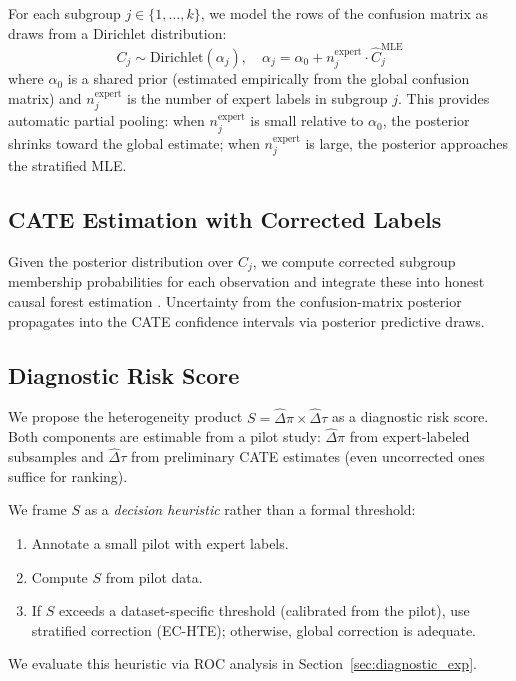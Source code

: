 \documentclass[11pt,a4paper]{article}
\begin{document}
For each subgroup $j \in \{1, \ldots, k\}$, we model the rows of the confusion matrix as draws from a Dirichlet distribution:
\begin{equation}
C_j \sim \text{Dirichlet}(\alpha_j), \quad \alpha_j = \alpha_0 + n_j^{\text{expert}} \cdot \hat{C}_j^{\text{MLE}}
\end{equation}
where $\alpha_0$ is a shared prior (estimated empirically from the global confusion matrix) and $n_j^{\text{expert}}$ is the number of expert labels in subgroup $j$.
This provides automatic partial pooling: when $n_j^{\text{expert}}$ is small relative to $\alpha_0$, the posterior shrinks toward the global estimate; when $n_j^{\text{expert}}$ is large, the posterior approaches the stratified MLE.

\subsection{CATE Estimation with Corrected Labels}

Given the posterior distribution over $C_j$, we compute corrected subgroup membership probabilities for each observation and integrate these into honest causal forest estimation \citep{athey2019grf}.
Uncertainty from the confusion-matrix posterior propagates into the CATE confidence intervals via posterior predictive draws.

\subsection{Diagnostic Risk Score}
\label{sec:diagnostic}

We propose the heterogeneity product $S = \hat{\Delta}\pi \times \hat{\Delta}\tau$ as a diagnostic risk score.
Both components are estimable from a pilot study:
$\hat{\Delta}\pi$ from expert-labeled subsamples and
$\hat{\Delta}\tau$ from preliminary CATE estimates (even uncorrected ones suffice for ranking).

We frame $S$ as a \emph{decision heuristic} rather than a formal threshold:
\begin{enumerate}
\item Annotate a small pilot with expert labels.
\item Compute $S$ from pilot data.
\item If $S$ exceeds a dataset-specific threshold (calibrated from the pilot), use stratified correction (EC-HTE); otherwise, global correction is adequate.
\end{enumerate}
We evaluate this heuristic via ROC analysis in Section~\ref{sec:diagnostic_exp}.
\end{document}
